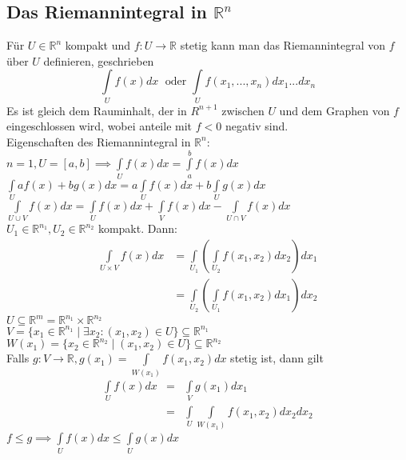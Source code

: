\subsection{Das Riemannintegral in $\mathbb{R}^n$}
  Für $U\in\mathbb R^n$ kompakt und $f: U\rightarrow\mathbb R$ stetig kann man
  das Riemannintegral von $f$ über $U$ definieren, geschrieben
  $$\int\limits_Uf(x)dx\;\text{ oder }\int\limits_Uf(x_1,...,x_n)dx_1...dx_n$$
  Es ist gleich dem Rauminhalt, der in $R^{n+1}$ zwischen $U$ und dem Graphen
  von $f$ eingeschlossen wird, wobei anteile mit $f<0$ negativ sind.\\
  Eigenschaften des Riemannintegral in $\mathbb R^n$:\\
    $n=1, U=[a,b]\implies\int\limits_Uf(x)dx=\int\limits_a^bf(x)dx$\\
    $\int\limits_Uaf(x)+bg(x)dx=a\int\limits_Uf(x)dx+b\int\limits_Ug(x)dx$\\
    $\int\limits_{U\cup V}f(x)dx=\int\limits_Uf(x)dx+\int\limits_Vf(x)dx-\int\limits_{U\cap V}f(x)dx$\\
    $U_1\in\mathbb R^{n_1}, U_2\in\mathbb R^{n_2}$ kompakt. Dann:
    $$\begin{array}{ll}
      \int\limits_{U\times
      V}f(x)dx&=\int\limits_{U_1}\left(\int\limits_{U_2}f(x_1,x_2)dx_2\right)dx_1\\
      &=\int\limits_{U_2}\left(\int\limits_{U_1}f(x_1,x_2)dx_1\right)dx_2
    \end{array}$$
    $U\subseteq\mathbb R^m=\mathbb R^{n_1}\times\mathbb R^{n_2}$\\
    $V=\{x_1\in\mathbb R^{n_1}\mid\exists x_2:(x_1,x_2)\in U\}\subseteq\mathbb
    R^{n_1}$\\
    $W(x_1)=\{x_2\in\mathbb R^{n_2}\mid(x_1,x_2)\in U\}\subseteq\mathbb
    R^{n_2}$\\
    Falls $g:V\rightarrow \mathbb R, g(x_1)=\int\limits_{W(x_1)}f(x_1,x_2)dx$ stetig
    ist, dann gilt $$\begin{array}{lcl}
      \int\limits_Uf(x)dx&=&\int\limits_Vg(x_1)dx_1\\
      &=&\int\limits_U\int\limits_{W(x_1)}f(x_1,x_2)dx_2dx_2
    \end{array}$$
    $f\leq g\implies\int\limits_Uf(x)dx\leq\int\limits_Ug(x)dx$\\
